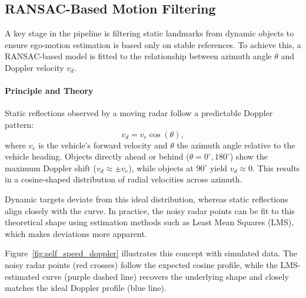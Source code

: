 \subsection{RANSAC-Based Motion Filtering}
A key stage in the pipeline is filtering static landmarks from dynamic objects to ensure ego-motion estimation is based only on stable references.  
To achieve this, a RANSAC-based model is fitted to the relationship between azimuth angle $\theta$ and Doppler velocity $v_d$.

\paragraph{Principle and Theory}
Static reflections observed by a moving radar follow a predictable Doppler pattern:
\[
v_d = v_e \cos(\theta),
\]
where $v_e$ is the vehicle’s forward velocity and $\theta$ the azimuth angle relative to the vehicle heading.  
Objects directly ahead or behind ($\theta = 0^\circ, 180^\circ$) show the maximum Doppler shift ($v_d \approx \pm v_e$), while objects at $90^\circ$ yield $v_d \approx 0$.  
This results in a cosine-shaped distribution of radial velocities across azimuth.  

Dynamic targets deviate from this ideal distribution, whereas static reflections align closely with the curve.
In practice, the noisy radar points can be fit to this theoretical shape using estimation methods such as Least Mean Squares (LMS), which makes deviations more apparent.  

Figure~\ref{fig:self_speed_doppler} illustrates this concept with simulated data.  
The noisy radar points (red crosses) follow the expected cosine profile, while the LMS-estimated curve (purple dashed line) recovers the underlying shape and closely matches the ideal Doppler profile (blue line).  

